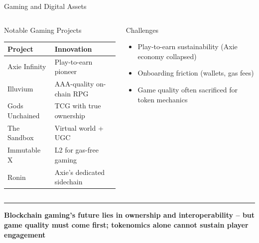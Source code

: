 \documentclass[8pt,aspectratio=169]{beamer}
\newcommand{\bottomnote}[1]{\vfill\vspace{-2mm}\textcolor{mllavender2}{\rule{\textwidth}{0.4pt}}\vspace{1mm}\footnotesize\textbf{#1}}
\begin{document}
\begin{frame}{Gaming and Digital Assets}
\begin{columns}[T]
\begin{block}{Notable Gaming Projects}
\footnotesize
\begin{tabular}{l l}
\toprule
\textbf{Project} & \textbf{Innovation} \\
\midrule
\rowcolor{mllavender4}
Axie Infinity & Play-to-earn pioneer \\
Illuvium & AAA-quality on-chain RPG \\
\rowcolor{mllavender4}
Gods Unchained & TCG with true ownership \\
The Sandbox & Virtual world + UGC \\
\rowcolor{mllavender4}
Immutable X & L2 for gas-free gaming \\
Ronin & Axie's dedicated sidechain \\
\bottomrule
\end{tabular}
\end{block}
\vspace{2mm}
\begin{alertblock}{Challenges}
\footnotesize
\begin{itemize}
  \item Play-to-earn sustainability (Axie economy collapsed)
  \item Onboarding friction (wallets, gas fees)
  \item Game quality often sacrificed for token mechanics
\end{itemize}
\end{alertblock}
\end{columns}
\bottomnote{Blockchain gaming's future lies in ownership and interoperability -- but game quality must come first; tokenomics alone cannot sustain player engagement}
\end{frame}
\end{document}
